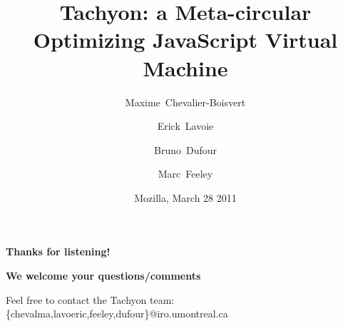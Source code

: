 \documentclass{beamer}
\title[Tachyon Overview]{Tachyon: a Meta-circular Optimizing JavaScript Virtual Machine}
\author[Chevalier-Boisvert, Lavoie, Dufour, Feeley]
{
  Maxime~Chevalier-Boisvert \and
  Erick~Lavoie \and
  Bruno~Dufour \and
  Marc~Feeley
}
\institute[UdeM]
{
  DIRO\\
  Universit\'e de Montr\'eal, Canada
}
\date[Mozilla 2011]
{Mozilla, March 28 2011}
\begin{document}
\begin{frame}
  \titlepage
\end{frame}




\begin{frame}{}
\begin{center}
{\huge\bfseries Thanks for listening!}

\vspace{5mm}%
{\large\bfseries We welcome your questions/comments}

\vspace{5mm}%
Feel free to contact the Tachyon team:\\
{\small\ttfamily \{chevalma,lavoeric,feeley,dufour\}@iro.umontreal.ca}
\end{center}
\end{frame}
\end{document}
